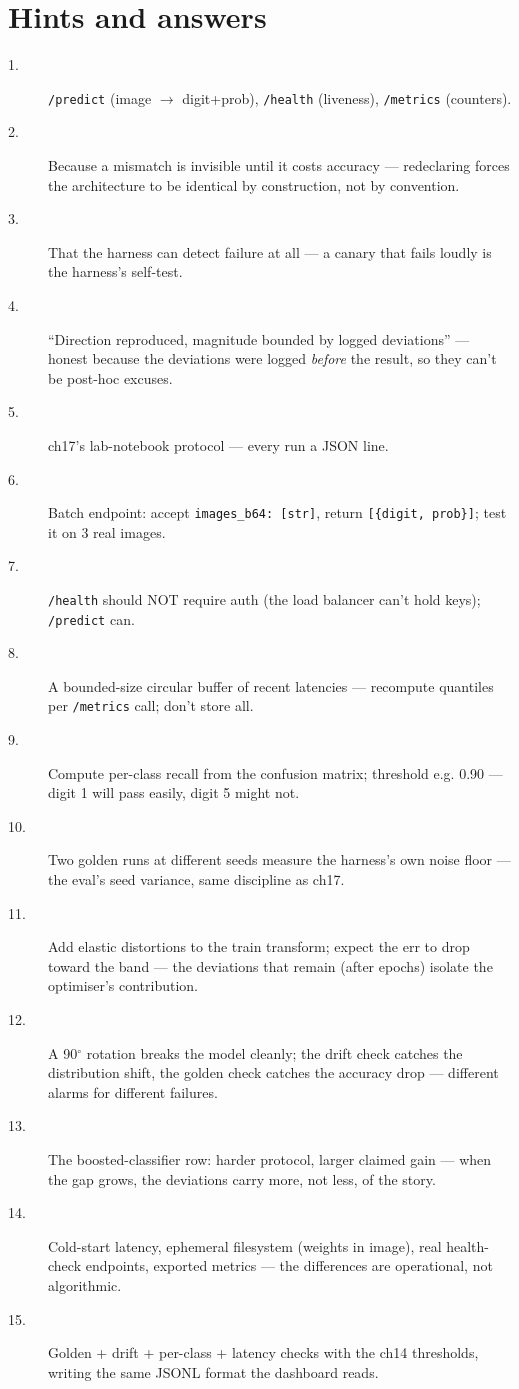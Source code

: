 \section*{Hints and answers}
\begin{description}
\item[1.] \texttt{/predict} (image $\to$ digit+prob),
\texttt{/health} (liveness), \texttt{/metrics} (counters).
\item[2.] Because a mismatch is invisible until it costs accuracy
--- redeclaring forces the architecture to be identical by
construction, not by convention.
\item[3.] That the harness can detect failure at all --- a canary
that fails loudly is the harness's self-test.
\item[4.] ``Direction reproduced, magnitude bounded by logged
deviations'' --- honest because the deviations were logged
\emph{before} the result, so they can't be post-hoc excuses.
\item[5.] ch17's lab-notebook protocol --- every run a JSON line.
\item[6.] Batch endpoint: accept \texttt{images\_b64: [str]},
return \texttt{[\{digit, prob\}]}; test it on 3 real images.
\item[7.] \texttt{/health} should NOT require auth (the load
balancer can't hold keys); \texttt{/predict} can.
\item[8.] A bounded-size circular buffer of recent latencies ---
recompute quantiles per \texttt{/metrics} call; don't store all.
\item[9.] Compute per-class recall from the confusion matrix;
threshold e.g. 0.90 --- digit 1 will pass easily, digit 5 might
not.
\item[10.] Two golden runs at different seeds measure the
harness's own noise floor --- the eval's seed variance, same
discipline as ch17.
\item[11.] Add elastic distortions to the train transform; expect
the err to drop toward the band --- the deviations that remain
(after epochs) isolate the optimiser's contribution.
\item[12.] A 90$^\circ$ rotation breaks the model cleanly; the
drift check catches the distribution shift, the golden check
catches the accuracy drop --- different alarms for different
failures.
\item[13.] The boosted-classifier row: harder protocol, larger
claimed gain --- when the gap grows, the deviations carry more,
not less, of the story.
\item[14.] Cold-start latency, ephemeral filesystem (weights in
image), real health-check endpoints, exported metrics --- the
differences are operational, not algorithmic.
\item[15.] Golden + drift + per-class + latency checks with the
ch14 thresholds, writing the same JSONL format the dashboard
reads.
\end{description}

